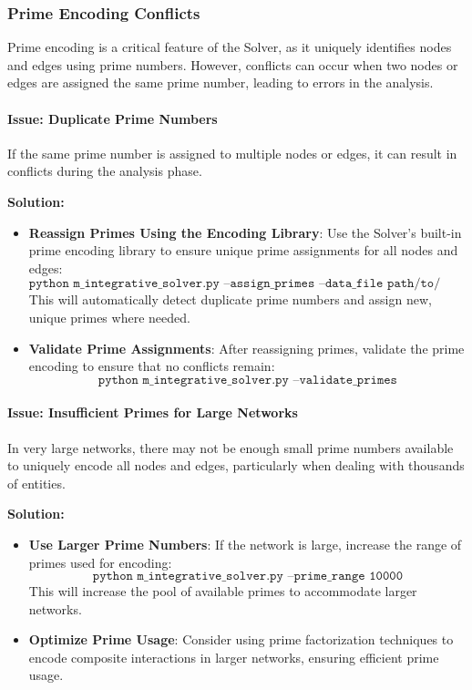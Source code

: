 \documentclass[%
 preprint, linenumbers,
 amsmath,amssymb,
 aps, physrev,
]{revtex4-2}
\begin{document}
\subsubsection{Prime Encoding Conflicts}

Prime encoding is a critical feature of the Solver, as it uniquely identifies nodes and edges using prime numbers. However, conflicts can occur when two nodes or edges are assigned the same prime number, leading to errors in the analysis.

\paragraph{Issue: Duplicate Prime Numbers}
If the same prime number is assigned to multiple nodes or edges, it can result in conflicts during the analysis phase.

\textbf{Solution:}
\begin{itemize}
    \item \textbf{Reassign Primes Using the Encoding Library}: Use the Solver’s built-in prime encoding library to ensure unique prime assignments for all nodes and edges:
    \[
    \texttt{python m\_integrative\_solver.py --assign\_primes --data\_file path/to/data.csv}
    \]
    This will automatically detect duplicate prime numbers and assign new, unique primes where needed.
    \item \textbf{Validate Prime Assignments}: After reassigning primes, validate the prime encoding to ensure that no conflicts remain:
    \[
    \texttt{python m\_integrative\_solver.py --validate\_primes}
    \]
\end{itemize}

\paragraph{Issue: Insufficient Primes for Large Networks}
In very large networks, there may not be enough small prime numbers available to uniquely encode all nodes and edges, particularly when dealing with thousands of entities.

\textbf{Solution:}
\begin{itemize}
    \item \textbf{Use Larger Prime Numbers}: If the network is large, increase the range of primes used for encoding:
    \[
    \texttt{python m\_integrative\_solver.py --prime\_range 10000}
    \]
    This will increase the pool of available primes to accommodate larger networks.
    \item \textbf{Optimize Prime Usage}: Consider using prime factorization techniques to encode composite interactions in larger networks, ensuring efficient prime usage.
\end{itemize}
\end{document}
